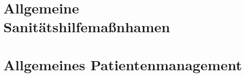 \documentclass[
ngerman,
paper=a4,
asymmetric,
fontsize=8pt,
draft=false,
numbers=noenddot,
bibtotocnumbered,
footnotes=multiple,
toc=flat,
]{scrbook}
\begin{document}
\chapter{Allgemeine Sanitätshilfemaßnhamen}


\clearpage



\cleardoublepage

\chapter{Allgemeines Patientenmanagement}

\label{apm}

\clearpage

% 
% 
% 
% 
% 
% 
% 
% 
% 
% 
% 
% 
% 
% 
% 
% 
% 
% 
% 
% 
% 
% 
% 
\end{document}
